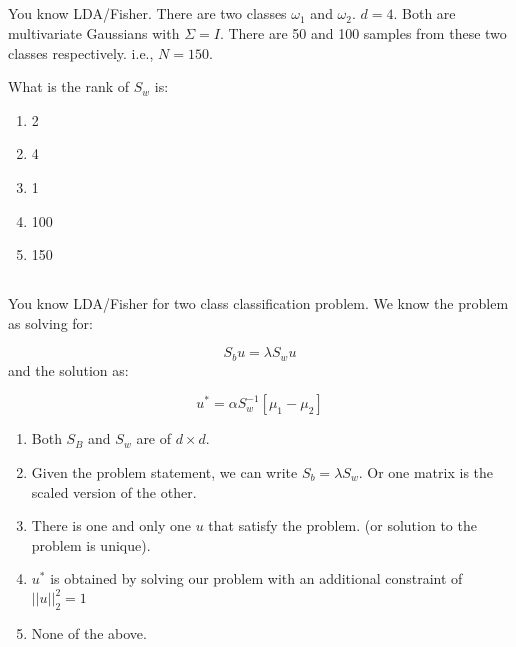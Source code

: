 \begin{frame}
\section{}
You know LDA/Fisher. There are two classes $\omega_1$ and $\omega_2$. $d=4$. Both are multivariate Gaussians with $\Sigma = I$. There are 50 and 100 samples from these two classes respectively. i.e., $N=150$.

What is the rank of $S_w$ is:
\begin{enumerate}[label=(\Alph*)]
\item 2
\item 4   %
\item 1
\item 100
\item 150
\end{enumerate}
\end{frame}

\begin{frame}
\section{}
You know LDA/Fisher for two class classification problem. We know the problem as solving for:

\[ S_b u = \lambda S_w u\] and the  solution as:

\[ u^* = \alpha S_w^{-1} [\mu_1 - \mu_2] \]

\begin{enumerate}[label=(\Alph*)]
\item Both $S_B$ and $S_w$ are of $d\times d$.     %
\item Given the problem statement, we can write $S_b  = \lambda S_w$. Or one matrix is the scaled version of the other.
\item There is one and only one $u$ that satisfy the problem. (or solution to the problem is unique).
\item $u^*$ is obtained by solving our problem with an additional constraint of $||u||_2^2 =1$
\item None of the above.    %
\end{enumerate}
\end{frame}
